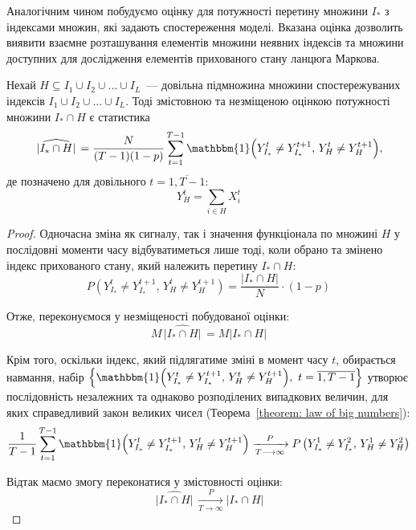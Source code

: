 Аналогічним чином побудуємо оцінку для потужності перетину множини $I_*$ з індексами множин, які задають спостереження моделі. Вказана оцінка дозволить виявити взаємне розташування елементів множини неявних індексів та множини доступних для дослідження елементів прихованого стану ланцюга Маркова.

\begin{claim}
    Нехай $H \subseteq I_1 \cup I_2 \cup \ldots \cup I_L$~--- довільна підмножина множини спостережуваних індексів $I_1 \cup I_2 \cup \ldots \cup I_L$. Тоді змістовною та незміщеною оцінкою потужності множини $I_* \cap H$ є статистика
    \begin{equation}\label{eq: ||I* cup H|| estimation}
        \widehat{\,|I_* \cap H|\,} = \frac{N}{(T-1)(1-p)} \sum_{t=1}^{T-1}\mathbbm{1} \Bigl( Y^t_{I_*} \neq Y^{t+1}_{I_*},\, Y^t_H \neq Y^{t+1}_H \Bigr),
    \end{equation}
    де позначено для довільного $t=\overline{1,T-1}:$ 
    \begin{equation*}
        Y^t_{H} = \sum_{i \in H} X^t_i
    \end{equation*}
\end{claim}
\begin{proof}
    Одночасна зміна як сигналу, так і значення функціонала по множині $H$ у послідовні моменти часу відбуватиметься лише тоді, коли обрано та змінено індекс прихованого стану, який належить перетину $I_* \cap H:$
    \begin{equation*}
        P\left( Y^t_{I_*} \neq Y^{t+1}_{I_*},\, Y^t_H \neq Y^{t+1}_H \right) = \frac{\left| I_* \cap H \right|}{N}\cdot (1-p)
    \end{equation*}

    Отже, переконуємося у незміщеності побудованої оцінки:
    \begin{equation*}
        M\widehat{\,|I_* \cap H|\,} = M|I_* \cap H| 
    \end{equation*}

    Крім того, оскільки індекс, який підлягатиме зміні в момент часу $t$, обирається навмання, набір $\left\{ \mathbbm{1} \Bigl( Y^t_{I_*} \neq Y^{t+1}_{I_*},\, Y^t_H \neq Y^{t+1}_H \Bigr),\ t=\overline{1,T-1} \right\}$ утворює послідовність незалежних та однаково розподілених випадкових величин, для яких справедливий закон великих чисел (Теорема~\ref{theorem: law of big numbers}):
    \begin{equation*}
        \frac{1}{T-1}\sum_{t=1}^{T-1}\mathbbm{1} \Bigl( Y^t_{I_*} \neq Y^{t+1}_{I_*},\, Y^t_H \neq Y^{t+1}_H \Bigr) \xrightarrow[T \longrightarrow \infty]{P} P\left( Y^1_{I_*} \neq Y^2_{I_*},\, Y^1_H \neq Y^2_H \right)
    \end{equation*}

    Відтак маємо змогу переконатися у змістовності оцінки:
    \begin{equation*}
        \widehat{\,|I_* \cap H|\,} \xrightarrow[T \longrightarrow \infty]{P} |I_* \cap H|
    \end{equation*}
\end{proof}

